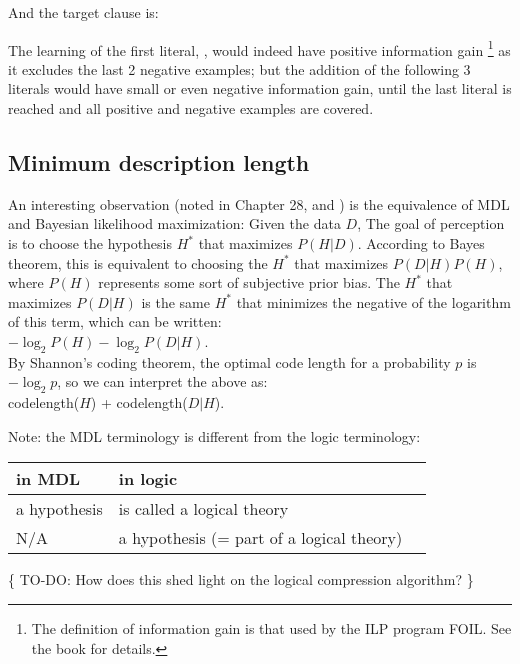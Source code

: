 And the target clause is:\\
\hspace*{1cm} 

The learning of the first literal, , would indeed have positive information gain
\footnote{The definition of information gain is that used by the ILP program FOIL.  See the book for details.}
 as it excludes the last 2 negative examples;  but the addition of the following 3 literals would have small or even negative information gain, until the last literal is reached and all positive and negative examples are covered.

\subsection{Minimum description length}

An interesting observation (noted in \citep*{MacKay2003} Chapter 28, and \citep*{Chater2005}) is the equivalence of MDL and Bayesian likelihood maximization:  Given the data $D$, The goal of perception is to choose the hypothesis $H^*$ that maximizes $P(H|D)$.  According to Bayes theorem, this is equivalent to choosing the $H^*$ that maximizes $P(D|H)P(H)$, where $P(H)$ represents some sort of subjective prior bias.  The $H^*$ that maximizes $P(D|H)$ is the same $H^*$ that minimizes the negative of the logarithm of this term, which can be written:\\
\hspace*{1cm} $-\log_2 P(H) - \log_2 P(D|H)$.\\
By Shannon's coding theorem, the optimal code length for a probability $p$ is $-\log_2 p$, so we can interpret the above as:\\
\hspace*{1cm} codelength($H$) + codelength($D|H$).

Note:  the MDL terminology is different from the logic terminology:\\
\hspace*{1cm} \begin{tabular}{l l l}
\textbf{in MDL}       & \textbf{in logic}\\
\hline
a hypothesis          & is called a logical theory\\
N/A                   & a hypothesis (= part of a logical theory)
\end{tabular}

\{ TO-DO:  How does this shed light on the logical compression algorithm? \}

